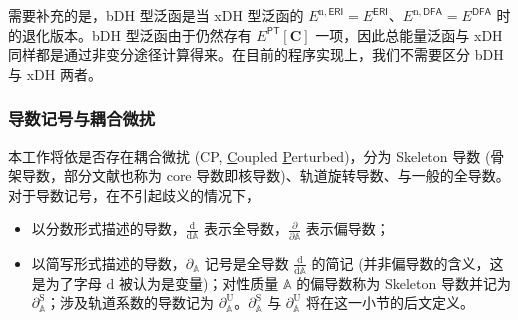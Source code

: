 需要补充的是，bDH 型泛函是当 xDH 型泛函的 $E^{\mathrm{n}, \textsf{ERI}} = E^\textsf{ERI}$、$E^{\mathrm{n}, \textsf{DFA}} = E^\textsf{DFA}$ 时的退化版本。bDH 型泛函由于仍然存有 $E^\textsf{PT} [\mathbf{C}]$ 一项，因此总能量泛函与 xDH 同样都是通过非变分途径计算得来。在目前的程序实现上，我们不需要区分 bDH 与 xDH 两者。

\subsubsection{导数记号与耦合微扰}

本工作将依是否存在耦合微扰 (CP, \underline{C}oupled \underline{P}erturbed)，分为 Skeleton 导数 (骨架导数，部分文献也称为 core 导数即核导数)、轨道旋转导数、与一般的全导数。对于导数记号，在不引起歧义的情况下，
\begin{itemize}[nosep]
  \item 以分数形式描述的导数，$\frac{\mathrm{d}}{\mathrm{d} \mathbb{A}}$ 表示全导数，$\frac{\partial}{\partial \mathbb{A}}$ 表示偏导数；
  \item 以简写形式描述的导数，$\partial_\mathbb{A}$ 记号是\textsf{全导数} $\frac{\mathrm{d}}{\mathrm{d} \mathbb{A}}$ 的简记 (并非偏导数的含义，这是为了字母 $\mathrm{d}$ 被认为是变量)；对性质量 $\mathbb{A}$ 的偏导数称为 Skeleton 导数并记为 $\partial_\mathbb{A}^\mathrm{S}$；涉及轨道系数的导数记为 $\partial_\mathbb{A}^\mathrm{U}$。$\partial_\mathbb{A}^\mathrm{S}$ 与 $\partial_\mathbb{A}^\mathrm{U}$ 将在这一小节的后文定义。
\end{itemize}

